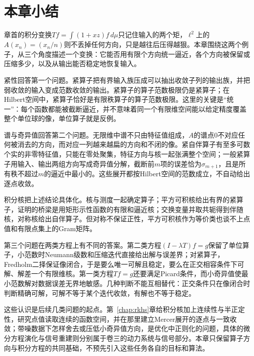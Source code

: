 
\section{本章小结}
\label{sec:ose-summary}

章首的积分变换$Tf=\int(1+xz)f\,d\mu$只记住输入的两个矩，$\ell^2$上的$A(x_n)=(x_n/n)$则不丢掉任何方向，只是越往后压得越狠。本章围绕这两个例子，从三个角度描述一个变换：它能否用有限个方向统一逼近，各个方向被保留或压缩多少，以及从输出能否稳定地恢复输入。

紧性回答第一个问题。紧算子把有界输入族压成可以抽出收敛子列的输出族，并把弱收敛的输入变成范数收敛的输出。紧算子的算子范数极限仍是紧算子；在Hilbert空间中，紧算子恰好是有限秩算子的算子范数极限。这里的关键是“统一”：每个函数都能被截断逼近，并不意味着同一个有限维空间能以给定精度覆盖整个单位球的像，单位算子就是反例。

谱与奇异值回答第二个问题。无限维中谱不只由特征值组成，$A$的谱点$0$不对应任何被消去的方向，而对应一列越来越扁的方向和不闭的像。紧自伴算子有至多可数个实的非零特征值，只能在零处聚集，特征方向与核一起张满整个空间；一般紧算子用输入、输出两组方向写成奇异值分解，截断前$m$项的误差恰为$\sigma_{m+1}$，且是所有秩不超过$m$的逼近中最小的。这些展开都按Hilbert空间的范数成立，不自动给出逐点收敛。

积分核把上述结论具体化。核与测度一起确定算子；平方可积核给出有界的紧算子，证明的桥梁是用矩形示性函数的有限和逼近核；交换变量并取共轭得到伴随核，对称核给出自伴算子。但对称不保证正性，平方可积核作为等价类也谈不上点值和有限点集上的Gram矩阵。

第三个问题在两类方程上有不同的答案。第二类方程$(I-\lambda T)f=g$保留了单位算子，小范数时Neumann级数和压缩迭代直接给出解与误差界；对紧算子，Fredholm二择保证像闭合，于是要么唯一可解且稳定，要么在正交相容条件下可解、解差一个有限维核。第一类方程$Tf=g$还要满足Picard条件，而小奇异值使最小范数解对数据误差无界地敏感。几种判断不能互相替代：正交条件只在像闭合时判断精确可解，可解不等于某个迭代收敛，有解也不等于稳定。

这些认识是后续几类问题的起点。第~\ref{chap:rkhs}章给积分核加上连续性与半正定性，研究点值读取连续的函数空间，并在那里建立Mercer展开的逐点与一致收敛；带噪数据下怎样舍去或压低小奇异值方向，是优化中正则化的问题，具体的微分方程演化与信号重建则分别属于卷三的动力系统与信号部分。本章只保留算子方向与积分方程的共同基础，不预先引入这些任务各自的目标和算法。
